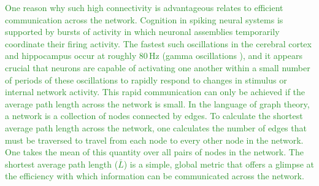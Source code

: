 \documentclass[twocolumn]{article}
\begin{document}
\textcolor{ForestGreen}{One reason why such high connectivity is advantageous relates to efficient communication across the network. Cognition in spiking neural systems is supported by bursts of activity in which neuronal assemblies temporarily coordinate their firing activity. The fastest such oscillations in the cerebral cortex and hippocampus occur at roughly 80\,Hz (gamma oscillations \cite{bu2006}), and it appears crucial that neurons are capable of activating one another within a small number of periods of these oscillations to rapidly respond to changes in stimulus or internal network activity. This rapid communication can only be achieved if the average path length across the network is small. In the language of graph theory, a network is a collection of nodes connected by edges. To calculate the shortest average path length across the network, one calculates the number of edges that must be traversed to travel from each node to every other node in the network. One takes the mean of this quantity over all pairs of nodes in the network. The shortest average path length ($\bar{L}$) is a simple, global metric that offers a glimpse at the efficiency with which information can be communicated across the network.}
\end{document}
